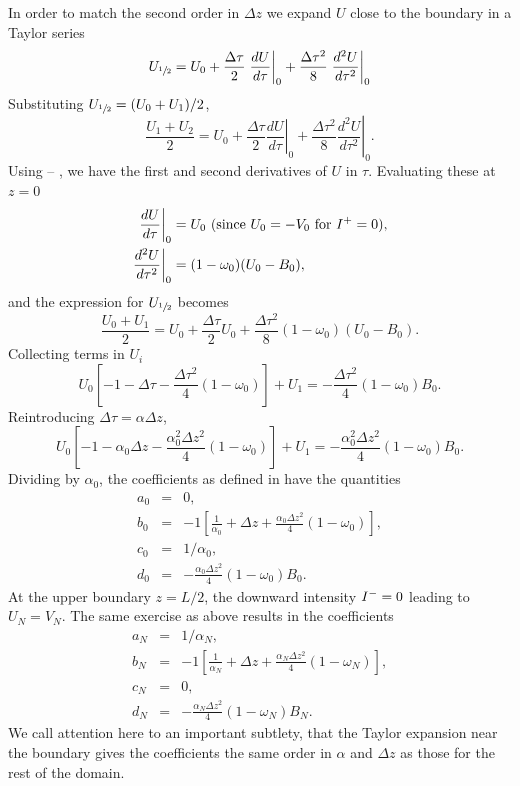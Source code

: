 In order to match the second order in $\Delta z$ we expand $U$ close to the boundary in a Taylor series
\begin{equation}
    U_{\sfrac{1}{2}} = U_0 + \frac{\Delta \tau}{2} \left. \frac{dU}{d\tau} \right|_0 + \frac{\Delta \tau^2}{8} \left. \frac{d^2U}{d\tau^2}\right|_0
\end{equation}
Substituting $U_{\sfrac{1}{2}} = (U_0 + U_1)/2$,
\begin{equation}
    \frac{U_1 + U_2}{2} = U_0 + \frac{\Delta \tau}{2} \left. \frac{dU}{d\tau} \right|_0 + \frac{\Delta \tau^2}{8} \left. \frac{d^2U}{d\tau^2}\right|_0.
\end{equation}
Using  -- , we have the first and second derivatives of $U$ in $\tau$.
Evaluating these at $z=0$
\begin{align}
    \left. \frac{dU}{d\tau} \right|_0 &= U_0 \text{  (since}\ U_0=-V_0 \text{ for } \Iplus=0), \\
    \left. \frac{d^2U}{d\tau^2}\right|_0 &= (1-\omega_0)(U_0-B_0),
\end{align}
and the expression for $U_{\sfrac{1}{2}}$ becomes
\begin{equation}
    \frac{U_0 + U_1}{2} = U_0 + \frac{\Delta \tau}{2} U_0 + \frac{\Delta \tau^2}{8} (1-\omega_0)(U_0-B_0).
\end{equation}
Collecting terms in $U_i$
\begin{equation}
    U_0 \left[ -1-\Delta \tau - \frac{\Delta \tau^2}{4}(1-\omega_0) \right] + U_1 = - \frac{\Delta \tau^2}{4}(1-\omega_0)B_0.
\end{equation}
Reintroducing $\Delta \tau =\alpha \Delta z$,
\begin{equation}
    U_0 \left[ -1-\alpha_0\Delta z - \frac{\alpha_0^2\Delta z^2}{4}(1-\omega_0) \right] + U_1 = - \frac{\alpha_0^2\Delta z^2}{4}(1-\omega_0)B_0.
\end{equation}
Dividing by $\alpha_0$, the coefficients as defined in  have the quantities
\begin{eqnarray}
    a_0 &=& 0, \\
    b_0 &=& -1\left[ \frac{1}{\alpha_0} + \Delta z + \frac{\alpha_0 \Delta z^2}{4}(1-\omega_0) \right], \\
    c_0 &=& 1/\alpha_{0}, \\
    d_0 &=& - \frac{\alpha_0 \Delta z^2}{4}(1-\omega_0) B_0.
\end{eqnarray}
At the upper boundary $z=L/2$, the downward intensity $I^-=0$ leading to $U_N=V_N$.
The same exercise as above results in the coefficients
\begin{eqnarray}
    a_N &=& 1/\alpha_N, \\
    b_N &=& -1\left[ \frac{1}{\alpha_N} + \Delta z + \frac{\alpha_N \Delta z^2}{4}(1-\omega_N) \right], \\
    c_N &=& 0, \\
    d_N &=& - \frac{\alpha_N \Delta z^2}{4}(1-\omega_N) B_N.
\end{eqnarray}
We call attention here to an important subtlety, that the Taylor expansion near the boundary gives the coefficients the same order in $\alpha$ and $\Delta z$ as those for the rest of the domain.

